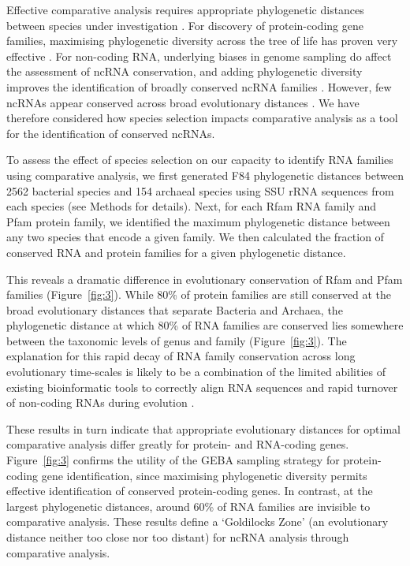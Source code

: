 \documentclass[10pt]{article}
\begin{document}
Effective comparative analysis requires appropriate phylogenetic
distances between species under investigation \cite{Eddy:2005}.  For
discovery of protein-coding gene families, maximising phylogenetic
diversity across the tree of life has proven very effective
\cite{Wu:2009,Rinke:2013}. For non-coding RNA, underlying biases in
genome sampling do affect the assessment of ncRNA conservation, and
adding phylogenetic diversity improves the identification of broadly
conserved ncRNA families \cite{Hoeppner:2012}. However, few ncRNAs
appear conserved across broad evolutionary distances
\cite{Hoeppner:2012}.
We have therefore considered how species selection impacts comparative
analysis as a tool for the identification of conserved ncRNAs.

To assess the effect of species selection on our capacity to identify
RNA families using comparative analysis, we first generated F84
phylogenetic distances between 2562 bacterial species and 154 archaeal
species using SSU rRNA sequences from each species (see Methods for
details). Next, for each Rfam RNA family and Pfam protein family, we
identified the maximum phylogenetic distance between any two species
that encode a given family. We then calculated the fraction of
conserved RNA and protein families for a given phylogenetic distance.

This reveals a dramatic difference in evolutionary conservation of
Rfam and Pfam families (Figure~\ref{fig:3}). While 80\% of protein families are
still conserved at the broad evolutionary distances that separate
Bacteria and Archaea, the phylogenetic distance at which 80\% of RNA
families are conserved lies somewhere between the taxonomic levels of
genus and family (Figure~\ref{fig:3}). The explanation for this rapid decay of RNA
family conservation across long evolutionary time-scales is likely to
be a combination of the limited abilities of existing bioinformatic
tools to correctly align RNA sequences \cite{Gardner:2005} and 
rapid turnover of non-coding RNAs during evolution
\cite{Hoeppner:2012}.

These results in turn indicate that appropriate evolutionary distances
for optimal comparative analysis differ greatly for protein- and
RNA-coding genes. Figure~\ref{fig:3} confirms the utility of the GEBA sampling
strategy \cite{Wu:2009,Rinke:2013} for protein-coding gene
identification, since maximising phylogenetic diversity permits effective
identification of conserved protein-coding genes. In contrast, at the
largest phylogenetic distances, around 60\% of RNA families are
invisible to comparative analysis. These results define a ‘Goldilocks
Zone’ (an evolutionary distance neither too close nor too distant) for
ncRNA analysis through comparative analysis.
\end{document}
